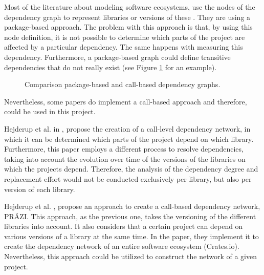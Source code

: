 Most of the literature about modeling software ecosystems, use the nodes of the dependency graph to represent libraries or versions of these \cite{decan2017empirical, hejderup2015dependencies, kikas2017structure}. They are using a package-based approach. The problem with this approach is that, by using this node definition, it is not possible to determine which parts of the project are affected by a particular dependency. The same happens with measuring this dependency. Furthermore, a package-based graph could define transitive dependencies that do not really exist (see Figure \ref{fig:example-call-based} for an example).

\begin{figure}[ht!]
    \centering
    \caption{Comparison package-based and call-based dependency graphs.}
    \label{fig:example-call-based}
\end{figure}

\bigskip\noindent
Nevertheless, some papers do implement a call-based approach and therefore, could be used in this project.

Hejderup et al. in \cite{hejderup2018software}, propose the creation of a call-level dependency network, in which it can be determined which parts of the project depend on which library. Furthermore, this paper employs a different process to resolve dependencies, taking into account the evolution over time of the versions of the libraries on which the projects depend. Therefore, the analysis of the dependency degree and replacement effort would not be conducted exclusively per library, but also per version of each library.

 Hejderup et al. \cite{hejderup2018prazi}, propose an approach to create a call-based dependency network, PRÄZI. This approach, as the previous one, takes the versioning of the different libraries into account. It also considers that a certain project can depend on various versions of a library at the same time. In the paper, they implement it to create the dependency network of an entire software ecosystem (Crates.io). Nevertheless, this approach could be utilized to construct the network of a given project.

